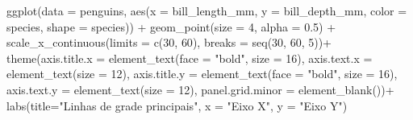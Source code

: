 \documentclass[
]{book}
\newenvironment{Shaded}{\begin{snugshade}}{\end{snugshade}}
\newcommand{\AttributeTok}[1]{\textcolor[rgb]{0.61,0.61,0.61}{#1}}
\newcommand{\DecValTok}[1]{\textcolor[rgb]{0.06,0.06,0.06}{#1}}
\newcommand{\FloatTok}[1]{\textcolor[rgb]{0.06,0.06,0.06}{#1}}
\newcommand{\FunctionTok}[1]{\textcolor[rgb]{0,0,0}{#1}}
\newcommand{\NormalTok}[1]{#1}
\newcommand{\SpecialCharTok}[1]{\textcolor[rgb]{0,0,0}{#1}}
\newcommand{\StringTok}[1]{\textcolor[rgb]{0.5,0.5,0.5}{#1}}
\begin{document}
\begin{Shaded}
\begin{Highlighting}[]

\FunctionTok{ggplot}\NormalTok{(}\AttributeTok{data =}\NormalTok{ penguins, }
       \FunctionTok{aes}\NormalTok{(}\AttributeTok{x =}\NormalTok{ bill\_length\_mm, }
           \AttributeTok{y =}\NormalTok{ bill\_depth\_mm,}
           \AttributeTok{color =}\NormalTok{ species,}
           \AttributeTok{shape =}\NormalTok{ species)) }\SpecialCharTok{+}
  \FunctionTok{geom\_point}\NormalTok{(}\AttributeTok{size =} \DecValTok{4}\NormalTok{, }\AttributeTok{alpha =} \FloatTok{0.5}\NormalTok{) }\SpecialCharTok{+}
  \FunctionTok{scale\_x\_continuous}\NormalTok{(}\AttributeTok{limits =} \FunctionTok{c}\NormalTok{(}\DecValTok{30}\NormalTok{, }\DecValTok{60}\NormalTok{), }\AttributeTok{breaks =} \FunctionTok{seq}\NormalTok{(}\DecValTok{30}\NormalTok{, }\DecValTok{60}\NormalTok{, }\DecValTok{5}\NormalTok{))}\SpecialCharTok{+}
  \FunctionTok{theme}\NormalTok{(}\AttributeTok{axis.title.x =} \FunctionTok{element\_text}\NormalTok{(}\AttributeTok{face =} \StringTok{"bold"}\NormalTok{, }\AttributeTok{size =} \DecValTok{16}\NormalTok{),}
        \AttributeTok{axis.text.x =} \FunctionTok{element\_text}\NormalTok{(}\AttributeTok{size =} \DecValTok{12}\NormalTok{),}
        \AttributeTok{axis.title.y =} \FunctionTok{element\_text}\NormalTok{(}\AttributeTok{face =} \StringTok{"bold"}\NormalTok{, }\AttributeTok{size =} \DecValTok{16}\NormalTok{),}
        \AttributeTok{axis.text.y =} \FunctionTok{element\_text}\NormalTok{(}\AttributeTok{size =} \DecValTok{12}\NormalTok{),}
        \AttributeTok{panel.grid.minor =} \FunctionTok{element\_blank}\NormalTok{())}\SpecialCharTok{+}
  \FunctionTok{labs}\NormalTok{(}\AttributeTok{title=}\StringTok{"Linhas de grade principais"}\NormalTok{, }\AttributeTok{x =} \StringTok{"Eixo X"}\NormalTok{, }\AttributeTok{y =} \StringTok{"Eixo Y"}\NormalTok{)}


\end{Highlighting}
\end{Shaded}
\end{document}
